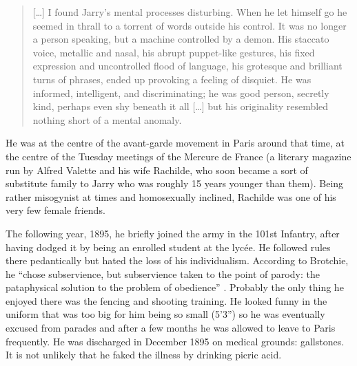\begin{quotation}
  [\ldots] I found Jarry's mental processes disturbing. When he let himself go he seemed in thrall to a torrent of words outside his control. It was no longer a person speaking, but a machine controlled by a demon. His staccato voice, metallic and nasal, his abrupt puppet-like gestures, his fixed expression and uncontrolled flood of language, his grotesque and brilliant turns of phrases, ended up provoking a feeling of disquiet. He was informed, intelligent, and discriminating; he was good person, secretly kind, perhaps even shy beneath it all [\ldots] but his originality resembled nothing short of a mental anomaly. 
\end{quotation}

He was at the centre of the avant-garde movement in Paris around that time, at the centre of the Tuesday meetings of the Mercure de France (a literary magazine run by Alfred Valette and his wife Rachilde, who soon became a sort of substitute family to Jarry who was roughly 15 years younger than them). Being rather misogynist at times and homosexually inclined, Rachilde was one of his very few female friends.

The following year, 1895, he briefly joined the army in the 101st Infantry, after having dodged it by being an enrolled student at the lycée. He followed rules there pedantically but hated the loss of his individualism. According to Brotchie, he ``chose subservience, but subservience taken to the point of parody: the pataphysical solution to the problem of obedience'' \autocite*{Brotchie2011a}. Probably the only thing he enjoyed there was the fencing and shooting training. He looked funny in the uniform that was too big for him being so small (5'3'') so he was eventually excused from parades and after a few months he was allowed to leave to Paris frequently. He was discharged in December 1895 on medical grounds: gallstones. It is not unlikely that he faked the illness by drinking picric acid.


